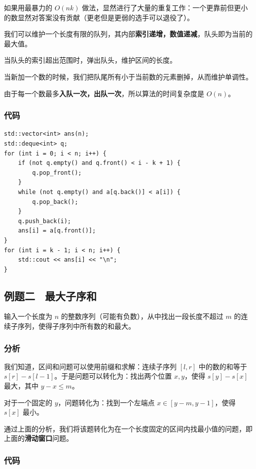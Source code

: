 \documentclass{report}
\begin{document}
如果用最暴力的 $O(n k)$ 做法，显然进行了大量的重复工作：一个更靠前但更小的数显然对答案没有贡献（更老但是更弱的选手可以退役了）。

我们可以维护一个长度有限的队列，其内部\textbf{索引递增，数值递减}，队头即为当前的最大值。

当队头的索引超出范围时，弹出队头，维护区间的长度。

当新加一个数的时候，我们把队尾所有小于当前数的元素删掉，从而维护单调性。

由于每一个数最多\textbf{入队一次，出队一次}，所以算法的时间复杂度是 $O(n)$。

\newpage

\subsubsection{代码}

\begin{verbatim}
std::vector<int> ans(n);
std::deque<int> q;
for (int i = 0; i < n; i++) {
    if (not q.empty() and q.front() < i - k + 1) {
        q.pop_front();
    }
    while (not q.empty() and a[q.back()] < a[i]) {
        q.pop_back();
    }
    q.push_back(i);
    ans[i] = a[q.front()];
}
for (int i = k - 1; i < n; i++) {
    std::cout << ans[i] << "\n";
}
\end{verbatim}

\subsection{例题二 \ 最大子序和}

输入一个长度为 $n$ 的整数序列（可能有负数），从中找出一段长度不超过 $m$ 的连续子序列，使得子序列中所有数的和最大。

\subsubsection{分析}

我们知道，区间和问题可以使用前缀和求解：连续子序列 $[l, r]$ 中的数的和等于 $s[r] - s[l - 1]$。于是问题可以转化为：找出两个位置 $x, y$，使得 $s[y] - s[x]$ 最大，其中 $y - x \le m$。

对于一个固定的 $y$，问题转化为：找到一个左端点 $x \in [y - m, y - 1]$，使得 $s[x]$ 最小。

通过上面的分析，我们将该题转化为在一个长度固定的区间内找最小值的问题，即上面的\textbf{滑动窗口}问题。

\subsubsection{代码}
\end{document}
